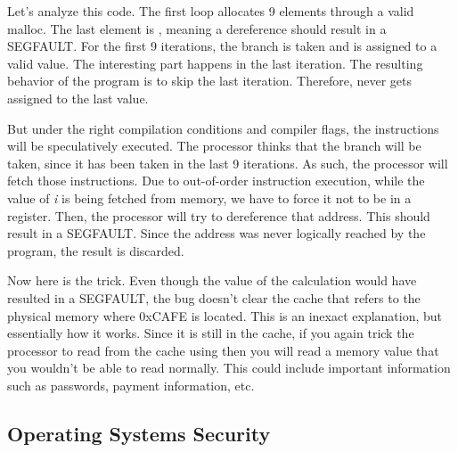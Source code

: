 Let's analyze this code.
The first loop allocates 9 elements through a valid malloc.
The last element is , meaning a dereference should result in a SEGFAULT.
For the first 9 iterations, the branch is taken and  is assigned to a valid value.
The interesting part happens in the last iteration.
The resulting behavior of the program is to skip the last iteration.
Therefore,  never gets assigned to the last value.

But under the right compilation conditions and compiler flags, the instructions will be speculatively executed.
The processor thinks that the branch will be taken, since it has been taken in the last 9 iterations.
As such, the processor will fetch those instructions.
Due to out-of-order instruction execution, while the value of \emph{i} is being fetched from memory, we have to force it not to be in a register.
Then, the processor will try to dereference that address.
This should result in a SEGFAULT.
Since the address was never logically reached by the program, the result is discarded.

Now here is the trick.
Even though the value of the calculation would have resulted in a SEGFAULT, the bug doesn't clear the cache that refers to the physical memory where 0xCAFE is located. This is an inexact explanation, but essentially how it works.
Since it is still in the cache, if you again trick the processor to read from the cache using  then you will read a memory value that you wouldn't be able to read normally.
This could include important information such as passwords, payment information, etc.

\subsection{Operating Systems Security}

